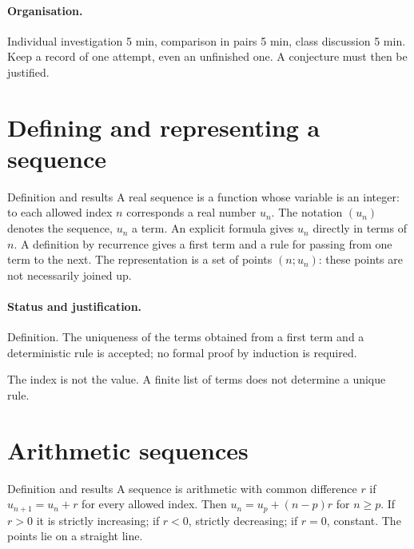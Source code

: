 \paragraph{Organisation.} Individual investigation 5 min, comparison in pairs 5 min, class discussion 5 min. Keep a record of one attempt, even an unfinished one. A conjecture must then be justified.
\section{Defining and representing a sequence}\label{C01-U1}
\begin{repere}{Definition and results}
A real sequence is a function whose variable is an integer: to each allowed index $n$ corresponds a real number $u_n$. The notation $(u_n)$ denotes the sequence, $u_n$ a term. An explicit formula gives $u_n$ directly in terms of $n$. A definition by recurrence gives a first term and a rule for passing from one term to the next. The representation is a set of points $(n;u_n)$: these points are not necessarily joined up.
\end{repere}
\paragraph{Status and justification.} Definition. The uniqueness of the terms obtained from a first term and a deterministic rule is accepted; no formal proof by induction is required.
\label{C01-EX1}

\begin{erreur}The index is not the value. A finite list of terms does not determine a unique rule.\end{erreur}
\label{C01-AP1}
\section{Arithmetic sequences}\label{C01-U2}
\begin{repere}{Definition and results}
A sequence is arithmetic with common difference $r$ if $u_{n+1}=u_n+r$ for every allowed index. Then $u_n=u_p+(n-p)r$ for $n\geq p$. If $r>0$ it is strictly increasing; if $r<0$, strictly decreasing; if $r=0$, constant. The points lie on a straight line.
\end{repere}
